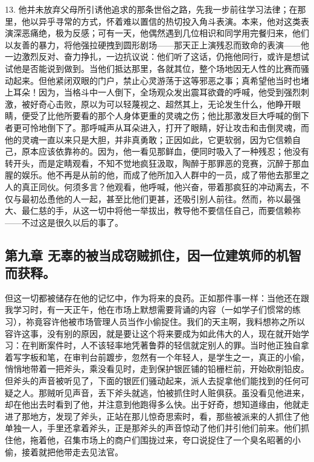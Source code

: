 13. 他并未放弃父母所引诱他追求的那条世俗之路，先我一步前往学习法律；在那里，他以异乎寻常的方式，怀着难以置信的热切投入角斗表演。本来，他对这类表演深恶痛绝，极为反感；可有一天，他偶然遇到几位相识和同学用完餐归来，他们以友善的暴力，将他强拉硬拽到圆形剧场——那天正上演残忍而致命的表演——他一边激烈反对、奋力挣扎，一边抗议说：他们听了这话，仍拖他同行，或许是想试试他是否能说到做到。当他们抵达那里，各就其位，整个场地因无人性的比赛而骚动起来。但他紧闭双眼的门户，禁止心灵游荡于这等邪恶之事；真希望他当时也堵上耳朵！因为，当格斗中一人倒下，全场观众发出震耳欲聋的呼喊，他受到强烈刺激，被好奇心击败，原以为可以轻蔑视之、超然其上，无论发生什么，他睁开眼睛，便受了比他所要看的那个人身体更重的灵魂之伤；他比那激发巨大呼喊的倒下者更可怜地倒下了。那呼喊声从耳朵进入，打开了眼睛，好让攻击和击倒灵魂，而他的灵魂一直以来只是大胆，并非真勇敢；正因如此，它更软弱，因为它信赖自己，原本应该依靠祢的。因为，他一看见那鲜血，便同时吸入了一种残忍；他没有转开头，而是定睛观看，不知不觉地疯狂汲取，陶醉于那罪恶的竞赛，沉醉于那血腥的娱乐。他不再是从前的他，而成了他所加入人群中的一员，成了带他去那里之人的真正同伙。何须多言？他观看，他呼喊，他兴奋，带着那疯狂的冲动离去，不仅与最初怂恿他的人一起，甚至比他们更甚，还吸引别人前往。然而，祢以最强大、最仁慈的手，从这一切中将他一举拔出，教导他不要信任自己，而要信赖祢——不过这是很久以后的事了。\par


\subsection{第九章 无辜的被当成窃贼抓住，因一位建筑师的机智而获释。}

但这一切都被储存在他的记忆中，作为将来的良药。正如那件事一样：当他还在跟我学习时，有一天正午，他在市场上默想需要背诵的内容（一如学子们惯常的练习），祢竟容许他被市场管理人员当作小偷捉住。我们的天主啊，我料想祢之所以容许这事，没有别的原因，就是要让这个将来要成为如此伟大的人，现在就开始学习：在判断案件时，人不该轻率地凭著鲁莽的轻信就定别人的罪。当时他正独自拿着写字板和笔，在审判台前踱步，忽然有一个年轻人，是学生之一，真正的小偷，悄悄地带着一把斧头，乘没看见时，走到保护银匠铺的铅栅栏前，开始砍削铅皮。但斧头的声音被听见了，下面的银匠们骚动起来，派人去捉拿他们能找到的任何可疑之人。那贼听见声音，丢下斧头就逃，怕被抓住时人赃俱获。虽没看见他进来，却在他出去时看到了他，并注意到他跑得多么快。出于好奇，想知道缘由，他就走进了那地方，发现了斧头，正站在那儿惊奇思索时，看，那些被派来的人抓住了他单独一人，手里还拿着斧头，正是那斧头的声音惊动了他们并引他们前来。他们抓住他，拖着他，召集市场上的商户们围拢过来，夸口说捉住了一个臭名昭著的小偷，接着就把他带走去见法官。\par

